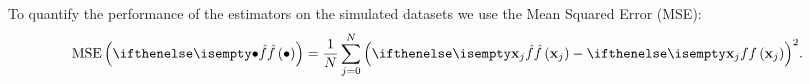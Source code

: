 To quantify the performance of the estimators on the simulated datasets we use the Mean Squared Error (MSE):
\begin{equation*}
	\varMSE{\varEstimatedDensityFunction{\bullet}} = \frac{1}{\varNumPatterns} \sum_{\itXs = 0}^{\varNumPatterns} {\left(\varEstimatedDensityFunction{\varPattern[\itXs]} - \varDensityFunction{\varPattern[\itXs]} \right)}^2.
\end{equation*}
